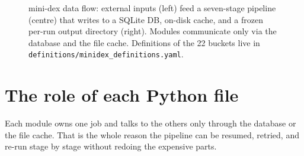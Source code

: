 \documentclass[11pt,a4paper,oneside]{article}
\begin{document}
\begin{figure}[h!]
\caption{mini-dex data flow: external inputs (left) feed a seven-stage pipeline (centre) that writes to a SQLite DB, on-disk cache, and a frozen per-run output directory (right). Modules communicate only via the database and the file cache. Definitions of the 22 buckets live in \texttt{definitions/minidex\_definitions.yaml}.}
\label{fig:dataflow}
\end{figure}

\section{The role of each Python file}

Each module owns one job and talks to the others only through the database or the file cache. That is the whole reason the pipeline can be resumed, retried, and re-run stage by stage without redoing the expensive parts.
\end{document}
